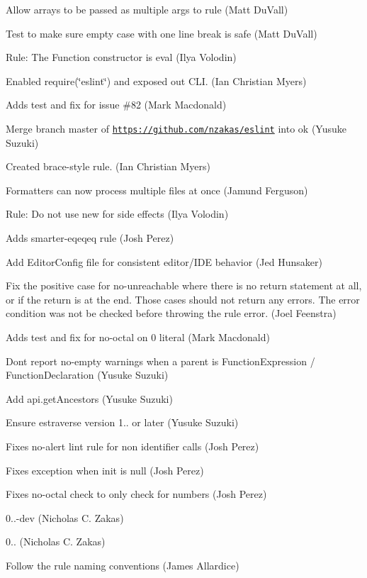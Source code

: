 \begin{DoxyItemize}
\item Allow arrays to be passed as multiple args to rule (Matt Du\+Vall)
\item Test to make sure empty case with one line break is safe (Matt Du\+Vall)
\item Rule\+: The Function constructor is eval (Ilya Volodin)
\item Enabled require(\char`\"{}eslint\char`\"{}) and exposed out C\+LI. (Ian Christian Myers)
\item Adds test and fix for issue \#82 (Mark Macdonald)
\item Merge branch \textquotesingle{}master\textquotesingle{} of \href{https://github.com/nzakas/eslint}{\tt https\+://github.\+com/nzakas/eslint} into ok (Yusuke Suzuki)
\item Created brace-\/style rule. (Ian Christian Myers)
\item Formatters can now process multiple files at once (Jamund Ferguson)
\item Rule\+: Do not use \textquotesingle{}new\textquotesingle{} for side effects (Ilya Volodin)
\item Adds smarter-\/eqeqeq rule (Josh Perez)
\item Add Editor\+Config file for consistent editor/\+I\+DE behavior (Jed Hunsaker)
\item Fix the positive case for no-\/unreachable where there is no return statement at all, or if the return is at the end. Those cases should not return any errors. The error condition was not be checked before throwing the rule error. (Joel Feenstra)
\item Adds test and fix for no-\/octal on 0 literal (Mark Macdonald)
\item Don\textquotesingle{}t report no-\/empty warnings when a parent is Function\+Expression / Function\+Declaration (Yusuke Suzuki)
\item Add api.\+get\+Ancestors (Yusuke Suzuki)
\item Ensure estraverse version 1.. or later (Yusuke Suzuki)
\item Fixes no-\/alert lint rule for non identifier calls (Josh Perez)
\item Fixes exception when init is null (Josh Perez)
\item Fixes no-\/octal check to only check for numbers (Josh Perez)
\item 0..-\/dev (Nicholas C. Zakas)
\item 0.. (Nicholas C. Zakas)
\item Follow the rule naming conventions (James Allardice)

\end{DoxyItemize}
